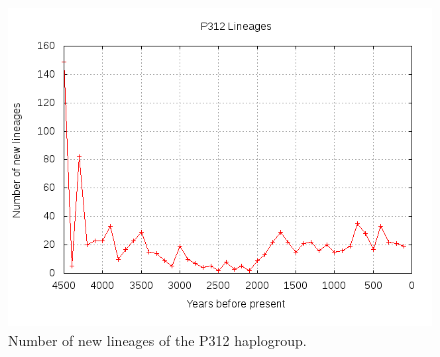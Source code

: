 \begin{figure}[ht]
\centering
\includegraphics[width=13cm]{img/P312.png}
\caption{Number of new lineages of the P312 haplogroup.}
\end{figure}






